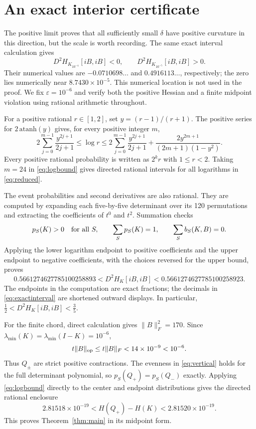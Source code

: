 \documentclass[11pt]{article}
\begin{document}
\section{An exact interior certificate}

The positive limit proves that all sufficiently small \(\delta\) have positive
curvature in this direction, but the scale is worth recording.  The same exact
interval calculation gives
\[
 D^2H_{K_{10^{-4}}}[iB,iB]<0,
 \qquad
 D^2H_{K_{10^{-5}}}[iB,iB]>0.
\]
Their numerical values are \(-0.0710698\ldots\) and \(0.4916113\ldots\),
respectively; the zero lies numerically near \(8.7430\times10^{-5}\).  This
numerical location is not used in the proof.  We fix \(\varepsilon=10^{-6}\)
and verify both the positive Hessian and a finite midpoint violation using
rational arithmetic throughout.

For a positive rational \(r\in[1,2]\), set \(y=(r-1)/(r+1)\).  The positive
series for \(2\,\mathrm{atanh}(y)\) gives, for every positive integer \(m\),
\begin{equation}\label{eq:logbound}
 2\sum_{j=0}^{m-1}\frac{y^{2j+1}}{2j+1}
 \le \log r\le
 2\sum_{j=0}^{m-1}\frac{y^{2j+1}}{2j+1}
 +\frac{2y^{2m+1}}{(2m+1)(1-y^2)}.
\end{equation}
Every positive rational probability is written as \(2^kr\) with
\(1\le r<2\).  Taking \(m=24\) in \eqref{eq:logbound} gives directed rational
intervals for all logarithms in \eqref{eq:reduced}.

The event probabilities and second derivatives are also rational.  They are
computed by expanding each five-by-five determinant over its 120 permutations
and extracting the coefficients of \(t^0\) and \(t^2\).  Summation checks
\[
 p_S(K)>0\quad\hbox{for all }S,
 \qquad \sum_Sp_S(K)=1,
 \qquad \sum_Sb_S(K,B)=0.
\]
Applying the lower logarithm endpoint to positive coefficients and the upper
endpoint to negative coefficients, with the choices reversed for the upper
bound, proves
\begin{equation}\label{eq:exactinterval}
 0.5661274627785100258893
 <D^2H_K[iB,iB]<
 0.5661274627785100258923.
\end{equation}
The endpoints in the computation are exact fractions; the decimals in
\eqref{eq:exactinterval} are shortened outward displays.  In particular,
\(\tfrac12<D^2H_K[iB,iB]<\tfrac35\).

For the finite chord, direct calculation gives \(\|B\|_F^2=170\).  Since
\(\lambda_{\min}(K)=\lambda_{\min}(I-K)=10^{-6}\),
\[
 t\|B\|_{\rm op}\le t\|B\|_F<14\times10^{-9}<10^{-6}.
\]
Thus \(Q_\pm\) are strict positive contractions.  The evenness in
\eqref{eq:vertical} holds for the full determinant polynomial, so
\(p_S(Q_+)=p_S(Q_-)\) exactly.  Applying \eqref{eq:logbound} directly to the
center and endpoint distributions gives the directed rational enclosure
\[
 2.81518\times10^{-19}<H(Q_+)-H(K)<2.81520\times10^{-19}.
\]
This proves Theorem~\ref{thm:main} in its midpoint form.
\end{document}
